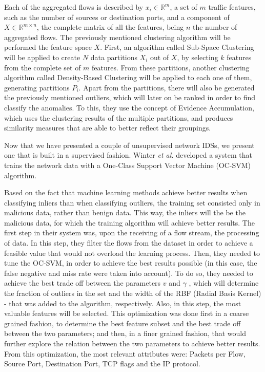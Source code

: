 \documentclass[runningheads,a4paper]{llncs}
\begin{document}
Each of the aggregated flows is described by $x_{i} \in \mathbb{R}^m $, a set of $m$ traffic features, such as the number of sources or destination ports, and a component of $ X \in \mathbb{R}^{m \times n}$, the complete matrix of all the features, being $n$ the number of aggregated flows. The previously mentioned clustering algorithm will be performed the feature space $X$. First, an algorithm called Sub-Space Clustering will be applied to create $N$ data partitions $X_{i}$ out of $X$, by selecting $k$ features from the complete set of $m$ features. From these partitions, another clustering algorithm called Density-Based Clustering will be applied to each one of them, generating partitions $P_{i}$. Apart from the partitions, there will also be generated the previously mentioned outliers, which will later on be ranked in order to find classify the anomalies. To this, they use the concept of Evidence Accumulation, which uses the clustering results of the multiple partitions, and produces similarity measures that are able to better reflect their groupings. 

Now that we have presented a couple of unsupervised network IDSs, we present one that is built in a supervised fashion. Winter \textit{et al.} \cite{Winter2011} developed a system that trains the network data with a One-Class Support Vector Machine (OC-SVM) algorithm. 

Based on the fact that machine learning methods achieve better results when classifying inliers than when classifying outliers, the training set consisted only in malicious data, rather than benign data. This way, the inliers will the be the malicious data, for which the training algorithm will achieve better results. The first step in their system was, upon the receiving of a flow stream, the processing of data. In this step, they filter the flows from the dataset in order to achieve a feasible value that would not overload the learning process. Then, they needed to tune the OC-SVM, in order to achieve the best results possible (in this case, the false negative and miss rate were taken into account). To do so, they needed to achieve the best trade off between the parameters $v$ and $\gamma$ , which will determine the fraction of outliers in the set and the width of the RBF (Radial Basis Kernel) - that was added to the algorithm, respectively. Also, in this step, the most valuable features will be selected. This optimization was done first in a coarse grained fashion, to determine the best feature subset and the best trade off between the two parameters; and then, in a finer grained fashion, that would further explore the relation between the two parameters to achieve better results. From this optimization, the most relevant attributes were: Packets per Flow, Source Port, Destination Port, TCP flags and the IP protocol.
\end{document}

